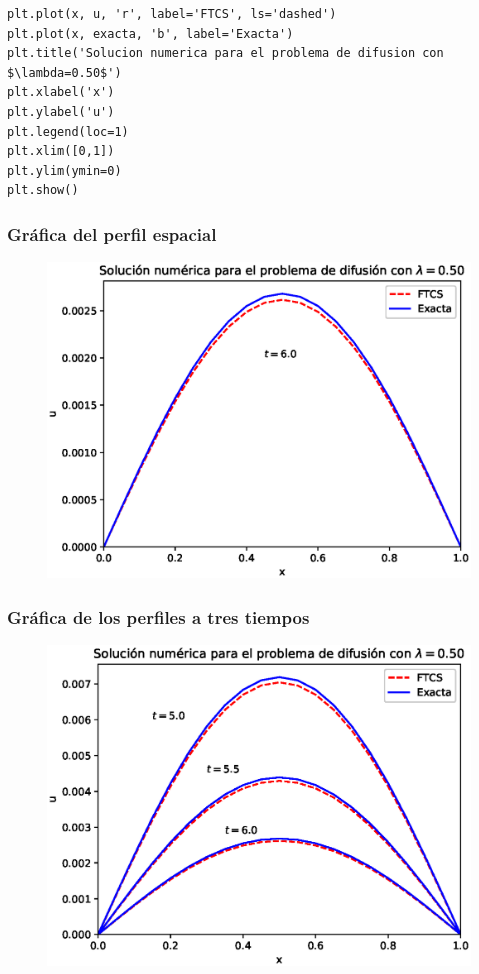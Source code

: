 {\begin{frame}
\begin{lstlisting}[caption=Programa principal para el ejercicio, style=FormattedNumber, basicstyle=\linespread{1.1}\ttfamily=\small, columns=fullflexible]
plt.plot(x, u, 'r', label='FTCS', ls='dashed')
plt.plot(x, exacta, 'b', label='Exacta')
plt.title('Solucion numerica para el problema de difusion con $\lambda=0.50$')
plt.xlabel('x')
plt.ylabel('u')
plt.legend(loc=1)
plt.xlim([0,1])
plt.ylim(ymin=0)
plt.show()
\end{lstlisting}
\end{frame}
\begin{frame}
\frametitle{Gráfica del perfil espacial}
\begin{figure}
	\centering
	\includegraphics[scale=0.6]{Imagenes/solucionFTSC_01.eps}
\end{figure}
\end{frame}
\begin{frame}
\frametitle{Gráfica de los perfiles a tres tiempos}
\begin{figure}
	\centering
	\includegraphics[scale=0.6]{Imagenes/solucionFTSC_02.eps}
\end{figure}
\end{frame}
}

